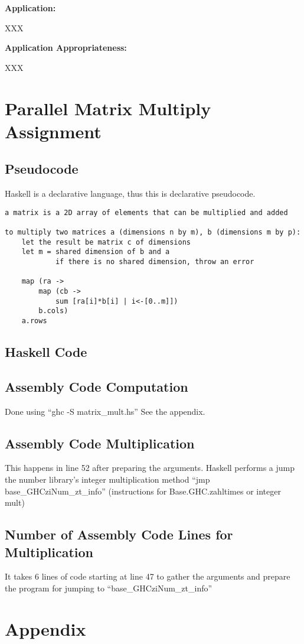\documentclass[hidelinks,12pt]{article}
\begin{document}
\begin{addmargin}[1cm]{0em}%
\textbf{Application:}
	\begin{addmargin}[1cm]{0em}%
		XXX
	\end{addmargin}
\end{addmargin}

\begin{addmargin}[1cm]{0em}%
\textbf{Application Appropriateness:}
	\begin{addmargin}[1cm]{0em}%
		XXX
	\end{addmargin}
\end{addmargin}




\section{Parallel Matrix Multiply Assignment}
\subsection{Pseudocode}
Haskell is a declarative language, thus this is declarative pseudocode.

\begin{verbatim}
a matrix is a 2D array of elements that can be multiplied and added

to multiply two matrices a (dimensions n by m), b (dimensions m by p):
    let the result be matrix c of dimensions
    let m = shared dimension of b and a
            if there is no shared dimension, throw an error

    map (ra ->
        map (cb ->
            sum [ra[i]*b[i] | i<-[0..m]])
        b.cols)
    a.rows
\end{verbatim}

\subsection{Haskell Code}

\subsection{Assembly Code Computation}
Done using ``ghc -S matrix\_mult.hs'' See the appendix.
\subsection{Assembly Code Multiplication}
This happens in line 52 after preparing the arguments.
Haskell performs a jump the number library's integer multiplication
method ``jmp base\_GHCziNum\_zt\_info'' (instructions for Base.GHC.zahltimes or
integer mult)
\subsection{Number of Assembly Code Lines for Multiplication}
It takes 6 lines of code starting at line 47 to gather the arguments and
prepare the program for jumping to ``base\_GHCziNum\_zt\_info''

\section{Appendix}

\end{document}
